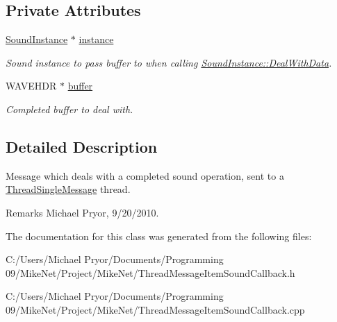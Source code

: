 \subsection*{Private Attributes}
\begin{DoxyCompactItemize}
\item 
\hypertarget{class_thread_message_item_sound_callback_a2f14d3ff4bf20d65df2bf31678c5098e}{
\hyperlink{class_sound_instance}{SoundInstance} $\ast$ \hyperlink{class_thread_message_item_sound_callback_a2f14d3ff4bf20d65df2bf31678c5098e}{instance}}
\label{class_thread_message_item_sound_callback_a2f14d3ff4bf20d65df2bf31678c5098e}

\begin{DoxyCompactList}\small\item\em Sound instance to pass {\itshape buffer\/} to when calling \hyperlink{class_sound_instance_a0dfcabaf68f2aa2e90ca6a9cd5310b3c}{SoundInstance::DealWithData}. \item\end{DoxyCompactList}\item 
\hypertarget{class_thread_message_item_sound_callback_a56d59788abd5580fd7fa646d50d95d97}{
WAVEHDR $\ast$ \hyperlink{class_thread_message_item_sound_callback_a56d59788abd5580fd7fa646d50d95d97}{buffer}}
\label{class_thread_message_item_sound_callback_a56d59788abd5580fd7fa646d50d95d97}

\begin{DoxyCompactList}\small\item\em Completed buffer to deal with. \item\end{DoxyCompactList}\end{DoxyCompactItemize}


\subsection{Detailed Description}
Message which deals with a completed sound operation, sent to a \hyperlink{class_thread_single_message}{ThreadSingleMessage} thread. \begin{DoxyRemark}{Remarks}
Michael Pryor, 9/20/2010. 
\end{DoxyRemark}


The documentation for this class was generated from the following files:\begin{DoxyCompactItemize}
\item 
C:/Users/Michael Pryor/Documents/Programming 09/MikeNet/Project/MikeNet/ThreadMessageItemSoundCallback.h\item 
C:/Users/Michael Pryor/Documents/Programming 09/MikeNet/Project/MikeNet/ThreadMessageItemSoundCallback.cpp\end{DoxyCompactItemize}
